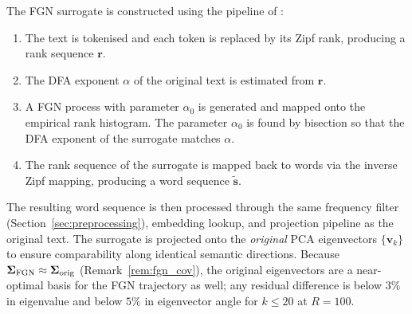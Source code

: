 \documentclass[12pt,a4paper]{article}
\newcommand{\vk}{\mathbf{v}_k}
\newcommand{\Sig}{\boldsymbol{\Sigma}}
\begin{document}
The FGN surrogate is constructed using the pipeline of
\citet{DegliEsposti2025}:
\begin{enumerate}
  \item The text is tokenised and each token is replaced by its Zipf
        rank, producing a rank sequence $\mathbf{r}$.
  \item The DFA exponent $\alpha$ of the original text is estimated
        from $\mathbf{r}$.
  \item A FGN process with parameter $\alpha_0$ is generated and
        mapped onto the empirical rank histogram.
        The parameter $\alpha_0$ is found by bisection so that the
        DFA exponent of the surrogate matches $\alpha$.
  \item The rank sequence of the surrogate is mapped back to words via
        the inverse Zipf mapping, producing a word sequence
        $\tilde{\mathbf{s}}$.
\end{enumerate}
The resulting word sequence is then processed through the same
frequency filter (Section~\ref{sec:preprocessing}), embedding
lookup, and projection pipeline as the original text.
The surrogate is projected onto the \emph{original} PCA eigenvectors
$\{\vk\}$ to ensure comparability along identical semantic directions.
Because $\Sig_{\rm FGN} \approx \Sig_{\rm orig}$ (Remark~\ref{rem:fgn_cov}),
the original eigenvectors are a near-optimal basis for the FGN
trajectory as well; any residual difference is below $3\%$ in
eigenvalue and below $5\%$ in eigenvector angle for $k \leq 20$
at $R = 100$.

%
%

\end{document}

